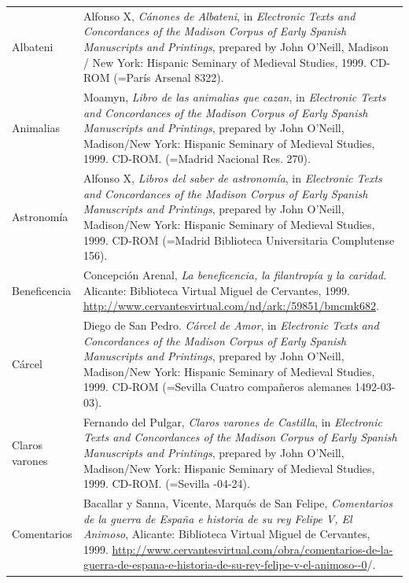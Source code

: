 \documentclass[output=paper]{langscibook}
\begin{document}
\begin{tabularx}{\textwidth}{XX}

\lsptoprule
Albateni & Alfonso X, \textit{Cánones de Albateni}, in \textit{Electronic Texts and Concordances of the Madison Corpus of Early Spanish Manuscripts and Printings}, prepared by John O’Neill, Madison / New York: Hispanic Seminary of Medieval Studies, 1999. CD-ROM (=París Arsenal 8322).\\
Animalias & Moamyn, \textit{Libro de las animalias que cazan}, in \textit{Electronic Texts and Concordances of the Madison Corpus of Early Spanish Manuscripts and Printings}, prepared by John O’Neill, Madison/New York: Hispanic Seminary of Medieval Studies, 1999. CD-ROM. (=Madrid Nacional Res. 270). \\
Astronomía & Alfonso X, \textit{Libros del saber de astronomía}, in \textit{Electronic Texts and Concordances of the Madison Corpus of Early Spanish Manuscripts and Printings}, prepared by John O’Neill, Madison/New York: Hispanic Seminary of Medieval Studies, 1999. CD-ROM (=Madrid Biblioteca Universitaria Complutense 156).\\
Beneficencia & Concepción Arenal, \textit{La beneficencia, la filantropía y la caridad}. Alicante: Biblioteca Virtual Miguel de Cervantes, 1999. \url{http://www.cervantesvirtual.com/nd/ark:/59851/bmcmk682}. \\
Cárcel  & Diego de San Pedro. \textit{Cárcel de Amor}, in \textit{Electronic Texts and Concordances of the Madison Corpus of Early Spanish Manuscripts and Printings}, prepared by John O’Neill, Madison/New York: Hispanic Seminary of Medieval Studies, 1999. CD-ROM (=Sevilla Cuatro compañeros alemanes 1492-03-03).\\
Claros varones  & Fernando del Pulgar, \textit{Claros varones de Castilla}, in \textit{Electronic Texts and Concordances of the Madison Corpus of Early Spanish Manuscripts and Printings}, prepared by John O’Neill, Madison/New York: Hispanic Seminary of Medieval Studies, 1999. CD-ROM. (=Sevilla \citealt{Polono1500}-04-24).\\
Comentarios  & Bacallar y Sanna, Vicente, Marqués de San Felipe, \textit{Comentarios de la guerra de España e historia de su rey Felipe V, El Animoso}, Alicante: Biblioteca Virtual Miguel de Cervantes, 1999. \href{http://www.cervantesvirtual.com/obra/comentarios-de-la-guerra-de-espana-e-historia-de-su-rey-felipe-v-el-animoso--0/}{{http://www.cervantesvirtual.com/obra/comentarios-de-la-guerra-de-espana-e-historia-de-su-rey-felipe-v-el-animoso-{}-0}}/.\\

\end{tabularx}
\end{document}
